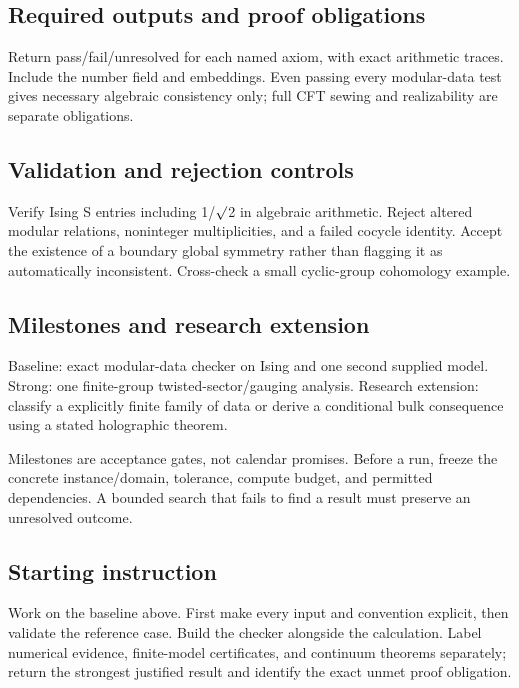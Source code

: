 \documentclass[
  11pt,
]{article}
\begin{document}
\subsection{Required outputs and proof obligations}

Return pass/fail/unresolved for each named axiom, with exact arithmetic
traces. Include the number field and embeddings. Even passing every
modular-data test gives necessary algebraic consistency only; full CFT
sewing and realizability are separate obligations.

\subsection{Validation and rejection controls}

Verify Ising S entries including 1/\ensuremath{\surd}2 in algebraic
arithmetic. Reject altered modular relations, noninteger multiplicities,
and a failed cocycle identity. Accept the existence of a boundary global
symmetry rather than flagging it as automatically inconsistent.
Cross-check a small cyclic-group cohomology example.

\subsection{Milestones and research extension}

Baseline: exact modular-data checker on Ising and one second supplied
model. Strong: one finite-group twisted-sector/gauging analysis.
Research extension: classify a explicitly finite family of data or
derive a conditional bulk consequence using a stated holographic
theorem.

Milestones are acceptance gates, not calendar promises. Before a run,
freeze the concrete instance/domain, tolerance, compute budget, and
permitted dependencies. A bounded search that fails to find a result
must preserve an unresolved outcome.

\subsection{Starting instruction}

Work on the baseline above. First make every input and convention
explicit, then validate the reference case. Build the checker alongside
the calculation. Label numerical evidence, finite-model certificates,
and continuum theorems separately; return the strongest justified result
and identify the exact unmet proof obligation.
\end{document}
